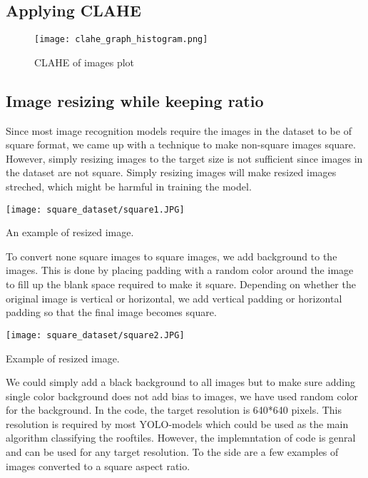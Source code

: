 \subsection{Applying CLAHE}
\begin{figure}[H] %
	\texttt{[image: clahe\_graph\_histogram.png]}
	\caption{CLAHE of images plot}
	\label{fig:clahe_graph_histogram} %
\end{figure}

\newpage
\subsection{Image resizing while keeping ratio}
Since most image recognition models require the images in the dataset to be of square format, we came up with a technique to make non-square images square. However, simply resizing images to the target size is not sufficient since images in the dataset are not square. Simply resizing images will make resized images streched, which might be harmful in training the model.

\begin{marginfigure} %
	\texttt{[image: square\_dataset/square1.JPG]}
	\caption{An example of resized image.}
\end{marginfigure}

To convert none square images to square images, we add background to the images. This is done by placing padding with a random color around the image to fill up the blank space required to make it square.
Depending on whether the original image is vertical or horizontal, we add vertical padding or horizontal padding so that the final image becomes square.


\begin{marginfigure} %
	\texttt{[image: square\_dataset/square2.JPG]}
	\caption{Example of resized image.}
\end{marginfigure}

We could simply add a black background to all images but to make sure adding single color background does not add bias to images, we have used random color for the background. 
In the code, the target resolution is 640*640 pixels. This resolution is required by most YOLO-models which could be used as the main algorithm classifying the rooftiles. However, the implemntation of code is genral and can be used for any target resolution. 
To the side are a few examples of images converted to a square aspect ratio.


